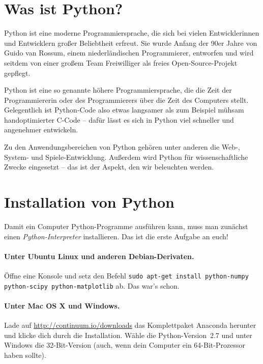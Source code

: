 \documentclass{blatt}
\begin{document}


\section{Was ist Python?}

Python ist eine moderne Programmiersprache, die sich bei vielen Entwicklerinnen
und Entwicklern großer Beliebtheit erfreut. Sie wurde Anfang der 90er Jahre von
Guido van Rossum, einem niederländischen Programmierer, entworfen und wird seitdem
von einer großem Team Freiwilliger als freies Open-Source-Projekt gepflegt.

Python ist eine so genannte höhere Programmiersprache, die die Zeit der
Programmiererin oder des Programmierers über die Zeit des Computers stellt.
Gelegentlich ist Python-Code also etwas langsamer als zum Beispiel mühsam
handoptimierter C-Code -- dafür lässt es sich in Python viel schneller und
angenehmer entwickeln.

Zu den Anwendungsbereichen von Python gehören unter anderen die Web-, System-
und Spiele-Entwicklung. Außerdem wird Python für wissenschaftliche Zwecke
eingesetzt -- das ist der Aspekt, den wir beleuchten werden.


\section{Installation von Python}

Damit ein Computer Python-Programme ausführen kann, muss man zunächst einen
\emph{Python-Interpreter} installieren. Das ist die erste Aufgabe an euch!

\paragraph{Unter Ubuntu Linux und anderen Debian-Derivaten.}
Öffne eine Konsole und setz den Befehl \texttt{sudo apt-get install
python-numpy python-scipy python-matplotlib} ab. Das war's schon.

\paragraph{Unter Mac OS X und Windows.} Lade auf
\url{http://continuum.io/downloads} das Komplettpaket Anaconda herunter und
klicke dich durch die Installation. Wähle die Python-Version~2.7 und unter
Windows die 32-Bit-Version (auch, wenn dein Computer ein 64-Bit-Prozessor haben
sollte).
\end{document}
